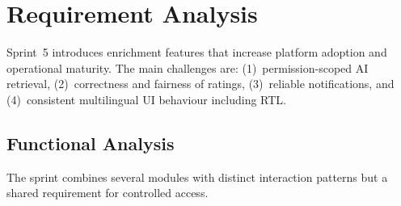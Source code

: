 \documentclass[a4paper,12pt]{report}
\begin{document}
\section{Requirement Analysis}
\label{sec:sprint5-analysis}

Sprint~5 introduces enrichment features that increase platform adoption and operational
maturity. The main challenges are: (1)~permission-scoped AI retrieval, (2)~correctness and
fairness of ratings, (3)~reliable notifications, and (4)~consistent multilingual UI behaviour
including RTL.

\subsection{Functional Analysis}

The sprint combines several modules with distinct interaction patterns but a shared
requirement for controlled access.
\end{document}

